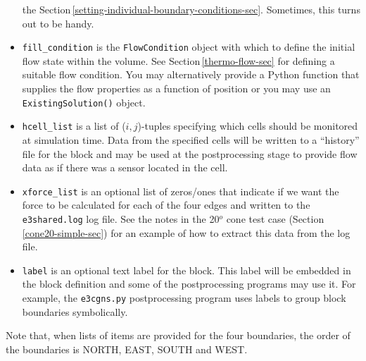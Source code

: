 \begin{itemize}
  the Section\,\ref{setting-individual-boundary-conditions-sec}.
  Sometimes, this turns out to be handy.
\item \texttt{fill\_condition} is the \texttt{FlowCondition} object with which to
  define the initial flow state within the volume.
  See Section\,\ref{thermo-flow-sec} for defining a suitable flow condition.
  You may alternatively provide a Python function that supplies the flow properties as
  a function of position or you may use an \texttt{ExistingSolution()} object.
\item \texttt{hcell\_list} is a list of ($i,j$)-tuples specifying which
  cells should be monitored at simulation time.
  Data from the specified cells will be written to a ``history'' file for the
  block and may be used at the postprocessing stage to provide flow data as if
  there was a sensor located in the cell.
\item \texttt{xforce\_list} is an optional list of zeros/ones that indicate if we
  want the force to be calculated for each of the four edges and written to the 
  \texttt{e3shared.log} log file.
  See the notes in the 20$^o$ cone test case (Section\,\ref{cone20-simple-sec}) for an
  example of how to extract this data from the log file. 
\item \texttt{label} is an optional text label for the block.  This label
  will be embedded in the block definition and some of the postprocessing
  programs may use it.
  For example, the \texttt{e3cgns.py} postprocessing program uses labels to group block boundaries symbolically.
\end{itemize}
Note that, when lists of items are provided for the four boundaries,
the order of the boundaries is NORTH, EAST, SOUTH and WEST.
 


